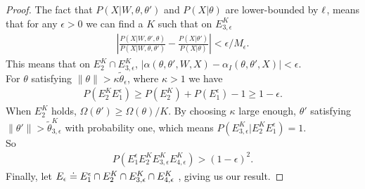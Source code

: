 \begin{proof}
The fact that ${P(X | W, \theta , \theta')}$ and ${P(X | \theta)}$
are lower-bounded by $\ell$, means that for any $\epsilon > 0$ we can 
find a $K$ such that on $E^K_{3,\epsilon}$
\begin{align*}
|\frac{P(X | W, \theta' , \theta)}{P(X | W, \theta , \theta')} - 
   \frac{P(X | \theta')}{P(X | \theta)}| < \epsilon / M_\epsilon.
\end{align*}
This means that on $E_2^K \cap E^K_{3,\epsilon}$,
$|\alpha(\theta, \theta', W, X) - \alpha_I(\theta, \theta', X)| < \epsilon$.\\
 For $\theta$ satisfying $ \| \theta \| > \kappa \tilde{\theta}_\epsilon$, where $\kappa > 1$ we have 
\begin{align*}
P(E^K_2 E^\epsilon_1) \ge P(E^K_2) + P(E_1^\epsilon) - 1 \ge 1 - \epsilon.
\end{align*}
When $E^K_2$ holds, $\Omega(\theta') \ge \Omega(\theta)/K$.
By choosing $\kappa$ large enough, $\theta'$ satisfying $ \| \theta' \| > \tilde{\theta}^K_{3,\epsilon}$ with probability one, which means $P(E_{3,\epsilon}^K | E_2^K E_1^\epsilon) = 1$.\\
So \begin{align*}
P(E_1^\epsilon E_2^K E_{3,\epsilon}^K E_{4,\epsilon}^K) > (1- \epsilon)^2.
\end{align*} 
Finally, let $E_\epsilon \doteq E_1^\epsilon \cap E_2^K \cap E_{3,\epsilon}^K \cap E_{4,\epsilon}^K$ , giving us our result.




\end{proof}

